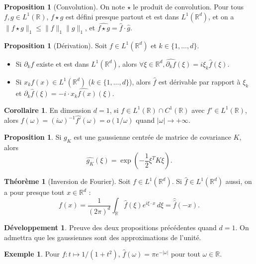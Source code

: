 \documentclass[11pt,a4paper,twocolumn]{article}
\theoremstyle{definition}
\newtheorem{example}[equation]{Exemple}
\newtheorem{proposition}[equation]{Proposition}
\newtheorem{theorem}[equation]{Théorème}
\newtheorem{corollary}[equation]{Corollaire}
\newcounter{n}
\newtheorem{dev}[n]{Développement}
\def\R{\mathbb{R}}
\def\hf{\hat{f}}
\def\hg{\hat{g}}
\begin{document}
\begin{proposition}[Convolution]
  On note $\star$ le produit de convolution. Pour tous $f, g \in L^1(\R)$,
  $f\star g$ est défini presque partout et est dans $L^1(\R^d)$, et on a $\|f \star
  g\|_1 \leq \|f\|_1 \|g\|_1$, et $\widehat{f \star g} = \hf \cdot \hg$.
\end{proposition}

\begin{proposition}[Dérivation]
  Soit $f \in L^1(\R^d)$ et $k \in \{1, \ldots, d\}$.
  \begin{itemize}
  \item Si $\partial_k f$ existe et est dans $L^1(\R^d)$, alors $\forall \xi \in
    \R^d, \widehat{\partial_k f}(\xi) = i\xi_k \hf(\xi)$. 
  \item Si $x_kf(x) \in L^1(\R^d)$ ($k \in \{1,\ldots,d\}$), alors $\hf$ est
    dérivable par rapport à $\xi_k$ et $\partial_k \hf(\xi) = -i \cdot
    \widehat{x_kf(x)}(\xi)$.
  \end{itemize}
\end{proposition}

\begin{corollary}
  En dimension $d = 1$, si $f \in L^1(\R) \cap C^1(\R)$ avec $f' \in L^1(\R)$,
  alors $\hf(\omega) = (i\omega)^{-1}\widehat{f'}(\omega) = o(1/\omega)$ quand
  $|\omega| \to +\infty$.
\end{corollary}

\begin{proposition}
  Si $g_K$ est une gaussienne centrée de matrice de covariance $K$, alors
  \[ \widehat{g_K}(\xi) = \exp\left( -\frac{1}{2}\xi^T K \xi \right).\]
\end{proposition}

\begin{theorem}[Inversion de Fourier]
  Soit $f \in L^1(\R^d)$. Si $\hat{f} \in L^1(\R^d)$ aussi, on a pour presque
  tout $x \in \R^d$ :
\[ f(x) = \frac{1}{(2\pi)^d} \int_\R \hf(\xi) e^{i\xi \cdot x} \,d\xi =
  \hat{\hf}(-x). \]
\end{theorem}

\begin{dev}
  Preuve des deux propositions précédentes quand $d = 1$. On admettra que les
  gaussiennes sont des approximations de l'unité.
\end{dev}

\begin{example}
  Pour $f : t \mapsto 1/(1+t^2)$, $\hf(\omega) = \pi e^{-|\omega|}$ pour tout $\omega \in \R$.
\end{example}
\end{document}

